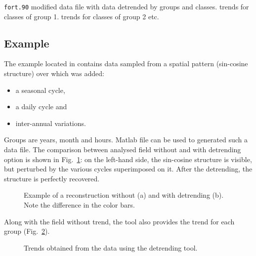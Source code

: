 \texttt{fort.90} modified data file with data detrended by groups and classes.  trends for classes of group 1.  trends for classes of group 2 etc.

\subsection{Example}

The example located in  contains data sampled from a spatial pattern (sin-cosine structure) over which was added: 
\begin{itemize}
\item a seasonal cycle, 
\item a daily cycle and 
\item inter-annual variations.
\end{itemize}

Groups are years, month and hours. Matlab file  can be used to generated such a data file. The comparison between analysed field without and with detrending option is shown in Fig.~\ref{fig:detrend1}: on the left-hand side, the sin-cosine structure is visible, but perturbed by the various cycles superimposed on it. After the detrending, the structure is perfectly recovered.

\begin{figure}[htpb]
\centering
{}
\caption[Example of a reconstruction without and with detrending.]{Example of a reconstruction without (a) and with detrending (b). Note the difference in the color bars.\label{fig:detrend1}}
\end{figure}

Along with the field without trend, the  tool also provides the trend for each group (Fig.~\ref{fig:detrend2}).

\begin{figure}[htpb]
\centering
{}
\caption{Trends obtained from the data using the detrending tool.\label{fig:detrend2}}
\end{figure}

